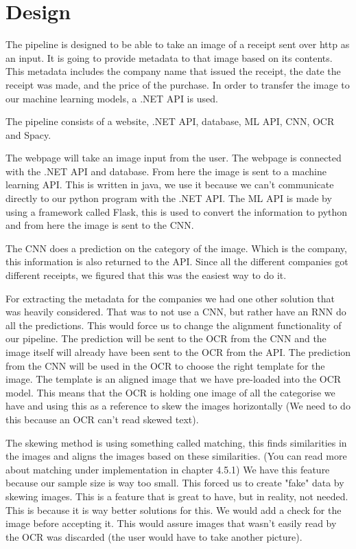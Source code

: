 \chapter{Design}
\label{ch:design}

The pipeline is designed to be able to take an image of a receipt sent over http as an input.
It is going to provide metadata to that image based on its contents.
This metadata includes the company name that issued the receipt, the date the receipt was made, and the price of the purchase.
In order to transfer the image to our machine learning models, a .NET API is used.

The pipeline consists of a website, .NET API, database, ML API, CNN, OCR and Spacy.

The webpage will take an image input from the user.
The webpage is connected with the .NET API and database.
From here the image is sent to a machine learning API\@.
This is written in java, we use it because we can't communicate directly to our python program with the .NET API\@.
The ML API is made by using a framework called Flask, this is used to convert the information to python and from here the image is sent to the CNN\@.

The CNN does a prediction on the category of the image.
Which is the company, this information is also returned to the API\@.
Since all the different companies got different receipts, we figured that this was the easiest way to do it.

For extracting the metadata for the companies we had one other solution that was heavily considered.
That was to not use a CNN, but rather have an RNN do all the predictions.
This would force us to change the alignment functionality of our pipeline.
The prediction will be sent to the OCR from the CNN and the image itself will already have been sent to the OCR from the API\@.
The prediction from the CNN will be used in the OCR to choose the right template for the image.
The template is an aligned image that we have pre-loaded into the OCR model.
This means that the OCR is holding one image of all the categorise we have and using this as a reference to skew the images horizontally (We need to do this because an OCR can't read skewed text).

The skewing method is using something called matching, this finds similarities in the images and aligns the images
based on these similarities. (You can read more about matching under implementation in chapter 4.5.1)
We have this feature because our sample size is way too small.
This forced us to create "fake" data by skewing images.
This is a feature that is great to have, but in reality, not needed.
This is because it is way better solutions for this.
We would add a check for the image before accepting it.
This would assure images that wasn't easily read by the OCR was discarded (the user would have to take another picture).

